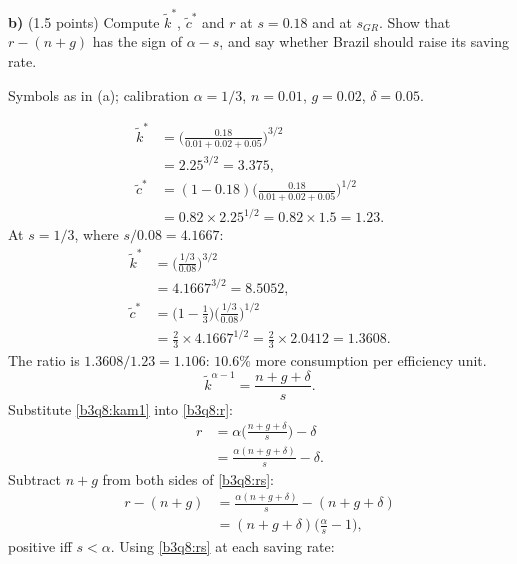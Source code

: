 \textbf{b)} (1.5 points) Compute $\tilde k^*$, $\tilde c^*$ and $r$ at $s=0.18$ and at $s_{GR}$. Show that $r-(n+g)$ has the sign of $\alpha-s$, and say
whether Brazil should raise its saving rate.
\resolespaco
\begin{sol}
\begin{notacao}
\item Symbols as in (a); calibration $\alpha=1/3$, $n=0.01$, $g=0.02$, $\delta=0.05$.
\end{notacao}
\begin{align*}
\tilde k^*&=\Big(\frac{0.18}{0.01+0.02+0.05}\Big)^{3/2}\\
&=2.25^{3/2}=3.375,\\
\tilde c^*&=(1-0.18)\Big(\frac{0.18}{0.01+0.02+0.05}\Big)^{1/2}\\
&=0.82\times2.25^{1/2}=0.82\times1.5=1.23 .
\end{align*}
At $s=1/3$, where $s/0.08=4.1667$:
\begin{align*}
\tilde k^*&=\Big(\frac{1/3}{0.08}\Big)^{3/2}\\
&=4.1667^{3/2}=8.5052,\\
\tilde c^*&=\Big(1-\frac13\Big)\Big(\frac{1/3}{0.08}\Big)^{1/2}\\
&=\tfrac23\times4.1667^{1/2}=\tfrac23\times2.0412=1.3608 .
\end{align*}
The ratio is $1.3608/1.23=1.106$: $10.6\%$ more consumption per efficiency unit.
\begin{equation}
\tilde k^{\alpha-1}=\frac{n+g+\delta}{s}. \label{b3q8:kam1}
\end{equation}
Substitute \eqref{b3q8:kam1} into \eqref{b3q8:r}:
\begin{align}
r&=\alpha\Big(\frac{n+g+\delta}{s}\Big)-\delta\nonumber\\
&=\frac{\alpha(n+g+\delta)}{s}-\delta. \label{b3q8:rs}
\end{align}
Subtract $n+g$ from both sides of \eqref{b3q8:rs}:
\begin{align*}
r-(n+g)&=\frac{\alpha(n+g+\delta)}{s}-(n+g+\delta)\\
&=(n+g+\delta)\Big(\frac{\alpha}{s}-1\Big),
\end{align*}
positive iff $s<\alpha$. Using \eqref{b3q8:rs} at each saving rate:
\begin{align*}

\end{align*}
\end{sol}
